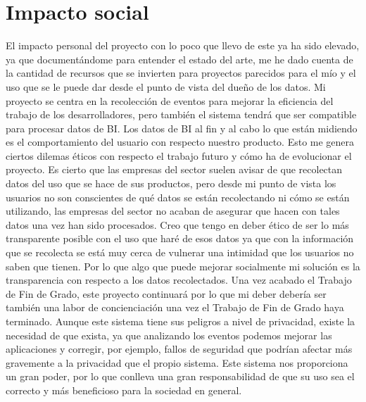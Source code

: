 \section{Impacto social}
El impacto personal del proyecto con lo poco que llevo de este ya ha sido elevado, ya que documentándome para entender el estado del arte, me he dado cuenta de la cantidad de recursos que se invierten para proyectos parecidos para el mío y el uso que se le puede dar desde el punto de vista del dueño de los datos. Mi proyecto se centra en la recolección de eventos para mejorar la eficiencia del trabajo de los desarrolladores, pero también el sistema tendrá que ser compatible para procesar datos de BI.
Los datos de BI al fin y al cabo lo que están midiendo es el comportamiento del usuario con respecto nuestro producto. Esto me genera ciertos dilemas éticos con respecto el trabajo futuro y cómo ha de evolucionar el proyecto. Es cierto que las empresas del sector suelen avisar de que recolectan datos del uso que se hace de sus productos, pero desde mi punto de vista los usuarios no son conscientes de qué datos se están recolectando ni cómo se están utilizando, las empresas del sector no acaban de asegurar que hacen con tales datos una vez han sido procesados.
Creo que tengo en deber ético de ser lo más transparente posible con el uso que haré de esos datos ya que con la información que se recolecta se está muy cerca de vulnerar una intimidad que los usuarios no saben que tienen. Por lo que algo que puede mejorar socialmente mi solución es la transparencia con respecto a los datos recolectados. Una vez acabado el Trabajo de Fin de Grado, este proyecto continuará por lo que mi deber debería ser también una labor de concienciación una vez el Trabajo de Fin de Grado haya terminado.
Aunque este sistema tiene sus peligros a nivel de privacidad, existe la necesidad de que exista, ya que analizando los eventos podemos mejorar las aplicaciones y corregir, por ejemplo, fallos de seguridad que podrían afectar más gravemente a la privacidad que el propio sistema. Este sistema nos proporciona un gran poder, por lo que conlleva una gran responsabilidad de que su uso sea el correcto y más beneficioso para la sociedad en general.

